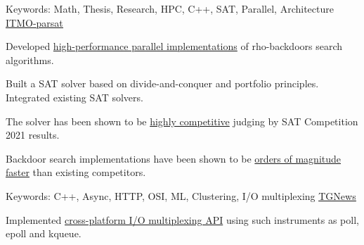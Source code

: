 

\begin{cventries}


\cventry
    {Keywords: Math, Thesis, Research, HPC, C++, SAT, Parallel, Architecture} %
    {\href{https://github.com/dzhiblavi/itmo-parsat}{\underline{ITMO-parsat}}} %
    {} %
    {} %
    {
      \begin{cvitems} %
        \item {
            Developed \underline{high-performance parallel implementations} of rho-backdoors 
            search algorithms.
        }
        \item {
            Built a SAT solver based on divide-and-conquer and portfolio principles.
            Integrated existing SAT solvers.
        }
        \item {
            The solver has been shown to be \underline{highly competitive} judging by 
            SAT Competition 2021 results.
        }
        \item {
            Backdoor search implementations have been shown to be 
            \underline{orders of magnitude faster} than existing competitors.
        }
      \end{cvitems}
    }

\cventry
    {Keywords: C++, Async, HTTP, OSI, ML, Clustering, I/O multiplexing} %
    {\href{https://github.com/dzhiblavi/tgnews}{\underline{TGNews}}} %
    {} %
    {} %
    {
      \begin{cvitems} %
        \item {
            Implemented \underline{cross-platform I/O multiplexing API} using such 
            instruments as poll, epoll and kqueue.
        }
      \end{cvitems}
    }
    

\end{cventries}
